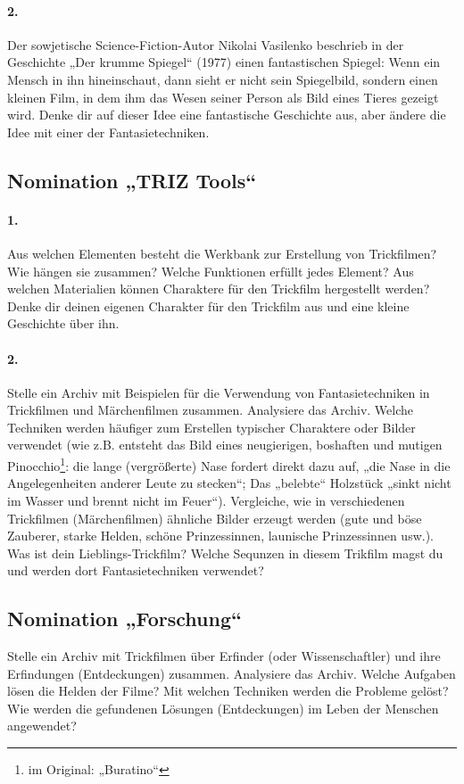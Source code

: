 \documentclass[11pt,a4paper]{article}
\begin{document}
\paragraph{2.}
Der sowjetische Science-Fiction-Autor Nikolai Vasilenko beschrieb in der
Geschichte „Der krumme Spiegel“ (1977) einen fantastischen Spiegel: Wenn ein
Mensch in ihn hineinschaut, dann sieht er nicht sein Spiegelbild, sondern
einen kleinen Film, in dem ihm das Wesen seiner Person als Bild eines Tieres
gezeigt wird. Denke dir auf dieser Idee eine fantastische Geschichte aus, aber
ändere die Idee mit einer der Fantasietechniken.

\subsection*{Nomination „TRIZ Tools“}

\paragraph{1.}
Aus welchen Elementen besteht die Werkbank zur Erstellung von Trickfilmen? Wie
hängen sie zusammen?  Welche Funktionen erfüllt jedes Element?  Aus welchen
Materialien können Charaktere für den Trickfilm hergestellt werden?  Denke dir
deinen eigenen Charakter für den Trickfilm aus und eine kleine Geschichte über
ihn.

\paragraph{2.}
Stelle ein Archiv mit Beispielen für die Verwendung von Fantasietechniken in
Trickfilmen und Märchenfilmen zusammen. Analysiere das Archiv. Welche
Techniken werden häufiger zum Erstellen typischer Charaktere oder Bilder
verwendet (wie z.B. entsteht das Bild eines neugierigen, boshaften und mutigen
Pinocchio\footnote{im Original: „Buratino“}: die lange (vergrößerte) Nase
fordert direkt dazu auf, „die Nase in die Angelegenheiten anderer Leute zu
stecken“; Das „belebte“ Holzstück „sinkt nicht im Wasser und brennt nicht im
Feuer“). Vergleiche, wie in verschiedenen Trickfilmen (Märchenfilmen) ähnliche
Bilder erzeugt werden (gute und böse Zauberer, starke Helden, schöne
Prinzessinnen, launische Prinzessinnen usw.). Was ist dein
Lieblings-Trickfilm? Welche Sequnzen in diesem Trikfilm magst du und werden
dort Fantasietechniken verwendet?

\subsection*{Nomination „Forschung“}
Stelle ein Archiv mit Trickfilmen über Erfinder (oder Wissenschaftler) und
ihre Erfindungen (Entdeckungen) zusammen. Analysiere das Archiv. Welche
Aufgaben lösen die Helden der Filme?  Mit welchen Techniken werden die
Probleme gelöst? Wie werden die gefundenen Lösungen (Entdeckungen) im Leben
der Menschen angewendet?
\end{document}
